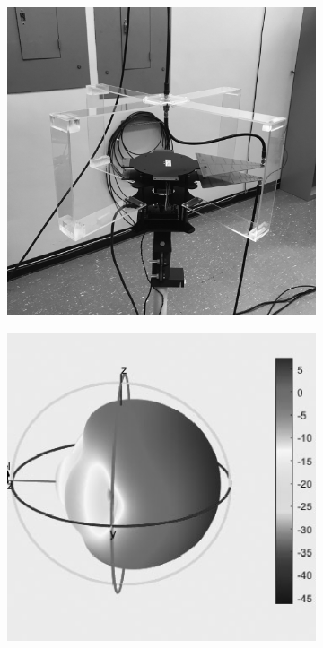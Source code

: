 \begin{figure}[t]
\begin{subfigure}[t]{0.22\textwidth}
\includegraphics[width=\textwidth]{figs/IMG_1669.eps}
\end{subfigure}
\hspace{\fill}
\begin{subfigure}[t]{0.22\textwidth}
\includegraphics[width=\textwidth]{figs/wa5vjb_2_6G.eps}

\end{subfigure}
\end{figure}
